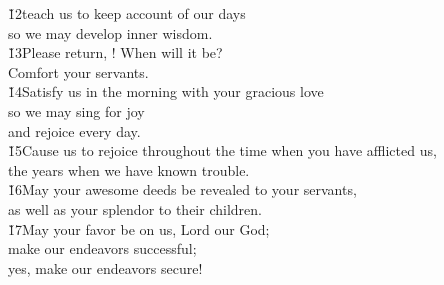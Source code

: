 \begin{poetry}
\poeml \v{12}teach us to keep account of our days \\
\poemll    so we may develop inner wisdom. \\
\poeml \v{13}Please return, ! When will it be? \\
\poemll    Comfort your servants. \\
\poeml \v{14}Satisfy us in the morning with your gracious love \\
\poemll    so we may sing for joy \\
\poemlll       and rejoice every day. \\
\poeml \v{15}Cause us to rejoice throughout the time when you have afflicted us, \\
\poemll    the years when we have known trouble. \\
\poeml \v{16}May your awesome deeds be revealed to your servants, \\
\poemll    as well as your splendor to their children. \\
\poeml \v{17}May your favor be on us, Lord our God; \\
\poemll    make our endeavors successful; \\
\poemlll       yes, make our endeavors secure!
\end{poetry}

